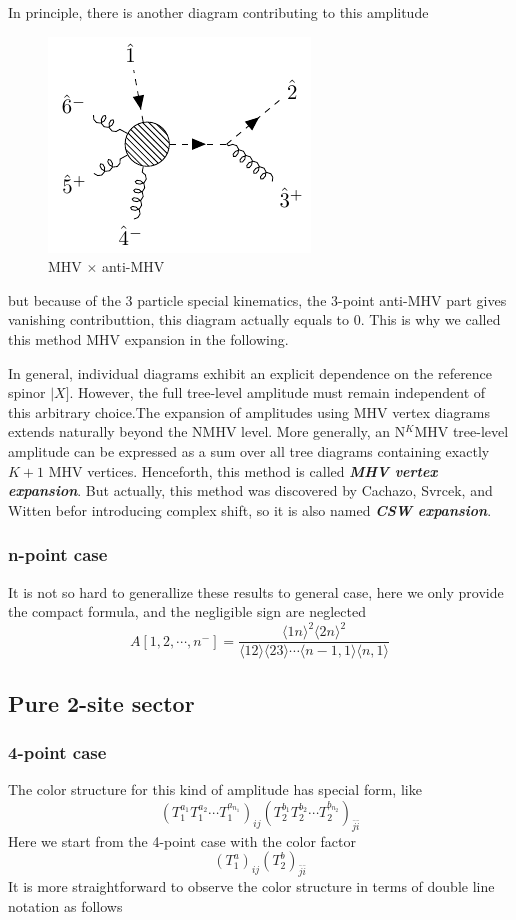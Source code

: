 \documentclass[12pt]{article}
\numberwithin{equation}{section}
\newcommand{\mdavg}[2]{\langle #1 \rangle\!\langle #2 \rangle}
\newcommand{\avg}[1]{\langle #1 \rangle}
\newcommand{\sket}[1]{|#1]}
\newcommand{\tif}[1]{\textit{\textbf{#1}}}
\begin{document}
In principle, there is another diagram contributing to this amplitude
\begin{figure}[H]
    \centering
    \includegraphics{sqcd6.pdf}
    \caption{MHV $\times$ anti-MHV}
\end{figure}
\noindent
but because of the 3 particle special kinematics, the 3-point anti-MHV part gives vanishing contributtion, this diagram actually equals to 0. This is why we called this method MHV expansion in the following.

In general, individual diagrams exhibit an explicit dependence on the reference spinor $\sket{X}$. However, the full tree-level amplitude must remain independent of this arbitrary choice.The expansion of amplitudes using MHV vertex diagrams extends naturally beyond the NMHV level. More generally, an N$^K$MHV tree-level amplitude can be expressed as a sum over all tree diagrams containing exactly $K + 1$ MHV vertices.
Henceforth, this method is called \tif{MHV vertex expansion}. But actually, this method was discovered by Cachazo, Svrcek, and Witten \cite{Cachazo:2004kj} befor introducing complex shift, so it is also named \tif{CSW expansion}. 
\subsubsection{n-point case}
It is not so hard to generallize these results to general case, here we only provide the compact formula, and the negligible sign are neglected
\begin{equation*}
    A[1,2,\cdots,n^-]=\frac{\avg{1n}^2\avg{2n}^2}{\mdavg{12}{23}\cdots\mdavg{n-1,1}{n,1}}
\end{equation*} 
\subsection{Pure 2-site sector}
\subsubsection{4-point case}
The color structure for this kind of amplitude has special form, like
\begin{equation}
    (T_1^{a_1}T_1^{a_2}\cdots T_1^{a_{n_1}})_{ij}(T_2^{b_1}T_2^{b_2}\cdots T_2^{b_{n_2}})_{\bar{j}\bar{i}}
\end{equation}
Here we start from the 4-point case with the color factor
\begin{equation}
    (T_1^a)_{ij}(T_2^b)_{\bar{j}\bar{i}}
\end{equation}
It is more straightforward to observe the color structure in terms of double line notation as follows 
\vspace{0.5em}
\end{document}
